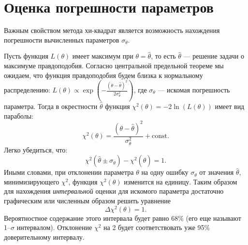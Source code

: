 \section{Оценка погрешности параметров}

Важным свойством метода хи-квадрат является  возможность
нахождения погрешности вычисленных параметров $\sigma_{\theta}$.

Пусть функция $L(\theta)$ имеет максимум при $\theta = \hat{\theta}$, то есть 
$\hat{\theta}$ --- решение задачи о максимуме правдоподобия. Согласно центральной предельной теореме мы ожидаем, что функция правдоподобия будем близка к нормальному распределению: $L(\theta) \propto \exp\left(-\frac{(\theta - \hat{\theta})^2}{2 \sigma_\theta^2}\right) $, 
где $\sigma_\theta$ --- искомая погрешность параметра. Тогда в окрестности $\hat{\theta}$ функция $\chi^2(\theta) = -2 \ln(L(\theta))$ имеет вид параболы:
\[
\chi^2(\theta) = \frac{(\theta - \hat{\theta})^2}{\sigma_{\theta}^2} +\mathrm{const}.
\]
Легко убедиться, что:
\begin{equation*}
    \chi^2(\hat{\theta} \pm \sigma_\theta) - \chi^2(\hat{\theta}) = 1.
\end{equation*}
Иными словами, при отклонении параметра $\theta$ на одну ошибку $\sigma_{\theta}$ от значения
$\hat{\theta}$, 
минимизирующего $\chi^2$, функция $\chi^2(\theta)$ изменится на единицу. Таким образом для нахождения \emph{интервальной} оценки для искомого параметра достаточно графическим или численным образом решить уравнение
\begin{equation}
    \label{eq:deltachi2}
    \Delta \chi^2(\theta) = 1.
\end{equation}
Вероятностное содержание этого интервала будет равно 68\% (его еще называют 1--$\sigma$ интервалом). 
Отклонение $\chi^2$ на 2 будет соответствовать уже 95\% доверительному интервалу.




